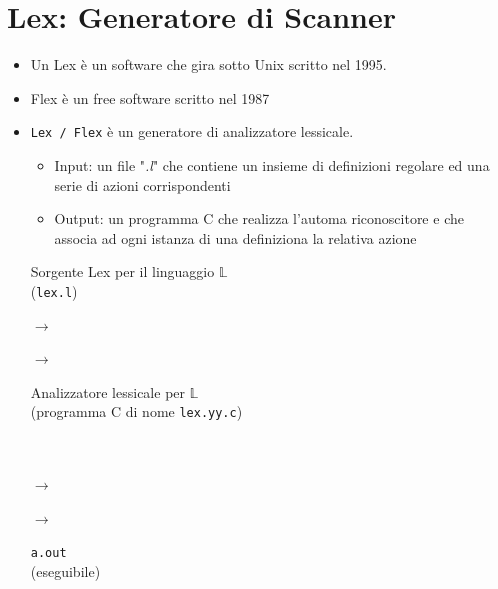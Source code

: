 \documentclass[a4paper,12pt]{article}
\begin{document}
{\section{Lex: Generatore di Scanner}
\begin{itemize}
  \item Un Lex è un software che gira sotto Unix scritto nel 1995. 
  \item Flex è un free software scritto nel 1987
  \item \texttt{Lex / Flex} è un generatore di analizzatore lessicale.
    \begin{itemize}
      \item Input: un file "\textit{.l}" che contiene un insieme di definizioni regolare ed una serie di azioni corrispondenti
      \item Output: un programma C che realizza l'automa riconoscitore e che associa ad ogni istanza di una definiziona la relativa azione \\
\end{itemize}
 \begin{minipage}{0.25\textwidth}
        Sorgente Lex per il linguaggio $\mathbb{L}$ \\(\texttt{lex.l}) 
     \end{minipage}
     $\to$
     \begin{minipage}{0.15\textwidth}
     \end{minipage}
    $\to$ 
     \begin{minipage}{0.40\textwidth}
    Analizzatore lessicale per $\mathbb{L}$ \\(programma C di nome \texttt{lex.yy.c})
     \end{minipage} \\
     \vspace{2em} \\
    $\to$ 
    \begin{minipage}{0.20\textwidth}
    \end{minipage}
    $\to$ 
    \begin{minipage}{0.20\textwidth}
      \texttt{a.out} \\(eseguibile)
    \end{minipage} \\
    \end{itemize}
}
\end{document}
